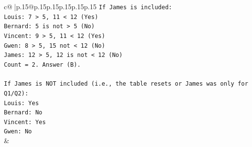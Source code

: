 \documentclass{article}
\begin{document}
{\begin{supertabular}{c@{$\;$}|p{.15\linewidth}@{}p{.15\linewidth}p{.15\linewidth}p{.15\linewidth}p{.15\linewidth}p{.15\linewidth}}
{{{\texttt{If James is included:} \\
\texttt{Louis: 7 > 5, 11 < 12 (Yes)} \\
\texttt{Bernard: 5 is not > 5 (No)} \\
\texttt{Vincent: 9 > 5, 11 < 12 (Yes)} \\
\texttt{Gwen: 8 > 5, 15 not < 12 (No)} \\
\texttt{James: 12 > 5, 12 is not < 12 (No)} \\
\texttt{Count = 2. Answer (B).} \\
\\ 
\texttt{If James is NOT included (i.e., the table resets or James was only for Q1/Q2):} \\
\texttt{Louis: Yes} \\
\texttt{Bernard: No} \\
\texttt{Vincent: Yes} \\
\texttt{Gwen: No} \\
            }
        }
    }
    & \\ \\

\end{supertabular}
}
\end{document}
